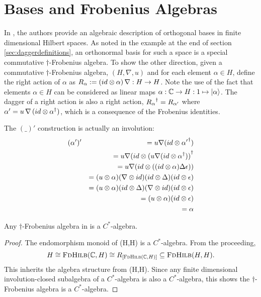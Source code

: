 \section{Bases and Frobenius Algebras} %
\label{sec:bases_and_frobenius_algebras}
In \cite{coeckeetal08:ortho}, the authors provide an algebraic description of orthogonal bases in
finite dimensional Hilbert spaces. As noted in the example at the end of section
\ref{sec:daggerdefinitions}, an orthonormal basis for such a space is a special commutative
$\dagger$-Frobenius algebra. To show the other direction, given a commutative $\dagger$-Frobenius
algebra, $(H,\nabla,u)$ and for each element $\alpha\in H$, define the right action of $\alpha$ as
$R_{\alpha}:=(id\otimes\alpha)\, \nabla:H\to H$. Note the use of the fact that elements $\alpha\in H$
can be considered as linear maps $\alpha:\mathbb{C} \to H:1\mapsto \left\vert{\alpha}\right\rangle$. The dagger of a right
action is also a right action, ${R_{\alpha}}^{\dagger} = R_{\alpha'}$ where $\alpha'= u\, \nabla\, (id\otimes
{\alpha}^{\dagger})$, which is a consequence of the Frobenius identities.

The $(\_)'$ construction is actually an involution:
\begin{eqnarray*}
  &(\alpha')' &= u \nabla (id \otimes {\alpha'}^{\dagger}) \\
  && = u \nabla (id \otimes {(u \nabla (id \otimes \ensuremath{{\alpha}^{\dagger}}))}^{\dagger}\\
  && = u \nabla (id \otimes ( (id \otimes \alpha) \Delta \epsilon))\\
  && = (u \otimes \alpha) (\nabla \otimes id) (id \otimes \Delta) (id \otimes  \epsilon)\\
  && = (u \otimes \alpha) (id \otimes \Delta) (\nabla \otimes id) (id \otimes  \epsilon)\\
  && = (u \otimes \alpha)  (id \otimes  \epsilon)\\
  && = \alpha
\end{eqnarray*}

\begin{lemma}\label{lemma:cstaralgebra}
  Any $\dagger$-Frobenius algebra in \fdh is a $C^{*}$-algebra.
\end{lemma}
\begin{proof}
  The endomorphism monoid of \fdh(H,H) is a $C^{*}$-algebra. From the proceeding,
  \[
    H \cong \textsc{FdHilb}(\mathbb{C},H) \cong R_{[\textsc{FdHilb}(\mathbb{C},H)]}\subseteq\textsc{FdHilb}(H,H).
  \]
  This inherits the algebra structure from \fdh(H,H). Since any finite dimensional
  involution-closed subalgebra of a $C^{*}$-algebra is also a $C^{*}$-algebra, this shows the
  $\dagger$-Frobenius algebra is a $C^{*}$-algebra.
\end{proof}

